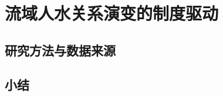 \chapter{流域人水关系演变的制度驱动}\label{cha:5}


\section{研究方法与数据来源}\label{ch5:methods}






\section{小结}\label{ch5:summary}

